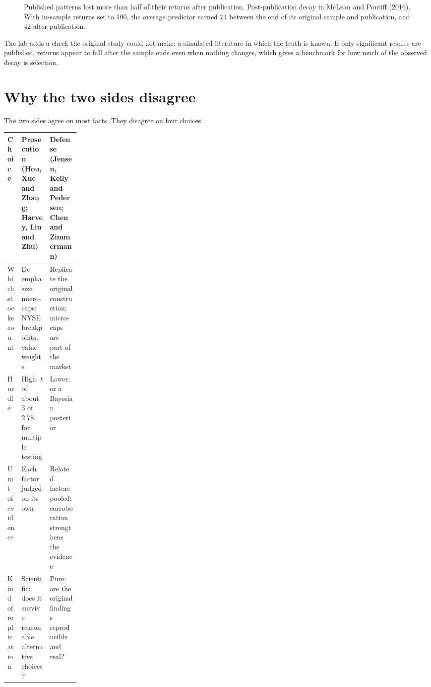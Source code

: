 \begin{figure}[htbp]
\centering
{}
\caption{Published patterns lost more than half of their returns after publication. Post-publication decay in McLean and Pontiff (2016). With in-sample returns set to 100, the average predictor earned 74 between the end of its original sample and publication, and 42 after publication.}
\label{fig:19-decay}
\end{figure}

The lab adds a check the original study could not make: a simulated literature in which the truth is known. If only significant results are published, returns appear to fall after the sample ends even when nothing changes, which gives a benchmark for how much of the observed decay is selection.

\section{Why the two sides disagree}
\label{sec:19-why}

The two sides agree on most facts. They disagree on four choices.

\begin{center}
\small
\begin{tabularx}{0.9\linewidth}{@{}>{\raggedright\arraybackslash}p{0.17\linewidth}>{\raggedright\arraybackslash}X>{\raggedright\arraybackslash}X@{}}
\toprule
Choice & Prosecution (Hou, Xue and Zhang; Harvey, Liu and Zhu) & Defense (Jensen, Kelly and Pedersen; Chen and Zimmermann) \\
\midrule
Which stocks count & De-emphasize micro-caps: NYSE breakpoints, value weights & Replicate the original construction; micro-caps are part of the market \\
Hurdle & High: $t$ of about 3 or 2.78, for multiple testing & Lower, or a Bayesian posterior \\
Unit of evidence & Each factor judged on its own & Related factors pooled; corroboration strengthens the evidence \\
Kind of replication & Scientific: does it survive reasonable alternative choices? & Pure: are the original findings reproducible and real? \\
\bottomrule
\end{tabularx}
\end{center}

